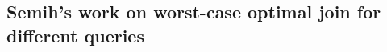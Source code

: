 

\subsection{Semih's work on worst-case optimal join for different queries}\label{subsec:wcoj-binary-joins}







